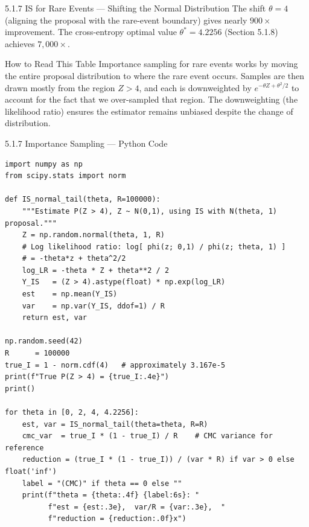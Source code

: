 \documentclass[aspectratio=169,10pt]{beamer}
\begin{document}
\begin{frame}[allowframebreaks]{5.1.7 IS for Rare Events --- Shifting the Normal Distribution}
The shift $\theta = 4$ (aligning the proposal with the rare-event boundary)
gives nearly $900\times$ improvement.  The cross-entropy optimal value
$\theta^* = 4.2256$ (Section 5.1.8) achieves $7{,}000\times$.

\begin{alertblock}{How to Read This Table}
  Importance sampling for rare events works by moving the entire proposal
  distribution to where the rare event occurs.  Samples are then drawn mostly
  from the region $Z > 4$, and each is downweighted by $e^{-\theta Z + \theta^2/2}$
  to account for the fact that we over-sampled that region.
  The downweighting (the likelihood ratio) ensures the estimator remains
  unbiased despite the change of distribution.
\end{alertblock}

\end{frame}

\begin{frame}[fragile]{5.1.7 Importance Sampling --- Python Code}
\begin{lstlisting}[style=python]
import numpy as np
from scipy.stats import norm

def IS_normal_tail(theta, R=100000):
    """Estimate P(Z > 4), Z ~ N(0,1), using IS with N(theta, 1) proposal."""
    Z = np.random.normal(theta, 1, R)
    # Log likelihood ratio: log[ phi(z; 0,1) / phi(z; theta, 1) ]
    # = -theta*z + theta^2/2
    log_LR = -theta * Z + theta**2 / 2
    Y_IS   = (Z > 4).astype(float) * np.exp(log_LR)
    est    = np.mean(Y_IS)
    var    = np.var(Y_IS, ddof=1) / R
    return est, var

np.random.seed(42)
R      = 100000
true_I = 1 - norm.cdf(4)   # approximately 3.167e-5
print(f"True P(Z > 4) = {true_I:.4e}")
print()

for theta in [0, 2, 4, 4.2256]:
    est, var = IS_normal_tail(theta=theta, R=R)
    cmc_var  = true_I * (1 - true_I) / R    # CMC variance for reference
    reduction = (true_I * (1 - true_I)) / (var * R) if var > 0 else float('inf')
    label = "(CMC)" if theta == 0 else ""
    print(f"theta = {theta:.4f} {label:6s}: "
          f"est = {est:.3e},  var/R = {var:.3e},  "
          f"reduction = {reduction:.0f}x")
\end{lstlisting}
\end{frame}
\end{document}

